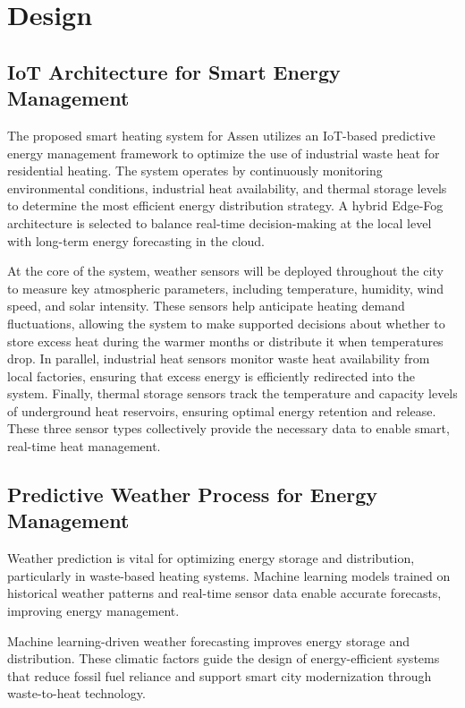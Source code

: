 \documentclass{article}
\begin{document}
\section{Design}

\subsection{IoT Architecture for Smart Energy Management}

The proposed smart heating system for Assen utilizes an IoT-based predictive energy management framework to optimize the use of industrial waste heat for residential heating. The system operates by continuously monitoring environmental conditions, industrial heat availability, and thermal storage levels to determine the most efficient energy distribution strategy. A hybrid Edge-Fog architecture is selected to balance real-time decision-making at the local level with long-term energy forecasting in the cloud.

At the core of the system, weather sensors will be deployed throughout the city to measure key atmospheric parameters, including temperature, humidity, wind speed, and solar intensity. These sensors help anticipate heating demand fluctuations, allowing the system to make supported decisions about whether to store excess heat during the warmer months or distribute it when temperatures drop. In parallel, industrial heat sensors monitor waste heat availability from local factories, ensuring that excess energy is efficiently redirected into the system. Finally, thermal storage sensors track the temperature and capacity levels of underground heat reservoirs, ensuring optimal energy retention and release. These three sensor types collectively provide the necessary data to enable smart, real-time heat management.

\subsection{Predictive Weather Process for Energy Management}

Weather prediction is vital for optimizing energy storage and distribution, particularly in waste-based heating systems. Machine learning models trained on historical weather patterns and real-time sensor data enable accurate forecasts, improving energy management.

Machine learning-driven weather forecasting improves energy storage and distribution. These climatic factors guide the design of energy-efficient systems that reduce fossil fuel reliance and support smart city modernization through waste-to-heat technology.
\end{document}
